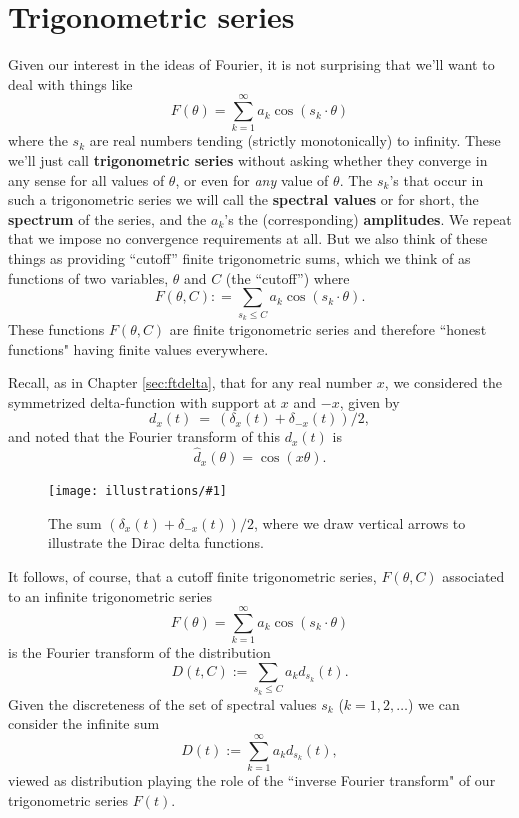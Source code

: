 \documentclass[openany]{book}
\newcommand{\ill}[3]{%
   \begin{figure}[H]%
   \vspace{-2ex}
   \centering%
   \texttt{[image: illustrations/\#1]}%
   \caption{#3}%
   \vspace{-2ex}
    \end{figure}}
\theoremstyle{plain}
\theoremstyle{definition}
\begin{document}
{%

\chapter{Trigonometric series}\label{ch:trigseries}
Given our interest in the ideas of Fourier, it is not surprising that
we'll want to deal with things like $$F(\theta) = \sum_{k=1}^{\infty}
a_k\cos(s_k\cdot \theta)$$ where the $s_k$ are real numbers tending
(strictly monotonically) to infinity.  These we'll just call {\bf
  trigonometric series} without asking whether they converge in any
sense for all values of $\theta$, or even for {\it any} value of $\theta$. The
$s_k$'s that occur in such a trigonometric series we will call the
{\bf spectral values} or for short, the {\bf spectrum} of the series,
and the $a_k$'s the (corresponding) {\bf amplitudes}.  We repeat that
we impose no convergence requirements at all. But we also think of
these things as providing ``cutoff'' finite trigonometric sums, which
we think of as functions of two variables, $\theta$ and $C$ (the
``cutoff'') where $$F(\theta,C): = \sum_{s_k\le C} a_k\cos(s_k\cdot \theta).$$ These functions $F(\theta,C)$ are finite trigonometric series and therefore ``honest functions" having finite values everywhere.




Recall, as in Chapter \ref{sec:ftdelta}, that for any real number $x$, we considered
the symmetrized delta-function with support at $x$ and $-x$, given
by
$$
 d_x(t) \ = \ (\delta_x(t) + \delta_{-x}(t))/2,
$$
and noted that the Fourier transform of this $d_x(t)$  is
$$
   \label{dx2}{\hat d_x}(\theta)  = \cos(x\theta).
$$
\ill{two_delta}{0.4}{The sum $(\delta_x(t) + \delta_{-x}(t))/2$,
where we draw vertical arrows to illustrate the Dirac delta functions.}

It follows, of course, that a cutoff finite trigonometric series,
$F(\theta,C)$ associated to an infinite trigonometric series
$$
 F(\theta) = \sum_{k=1}^{\infty} a_k\cos(s_k\cdot \theta)
$$
is the Fourier transform of the distribution
$$
 D(t,C):=\sum_{s_k \le C}a_kd_{s_k}(t).
$$
Given the discreteness of the set of spectral values $s_k$ ($k=1,2,\dots$)    we can
consider the infinite sum
$$
 D(t):=\sum_{k=1}^{\infty}a_kd_{s_k}(t),
$$ viewed as distribution playing the role of
the ``inverse Fourier transform" of our trigonometric
series $F(t)$.


}
\end{document}
